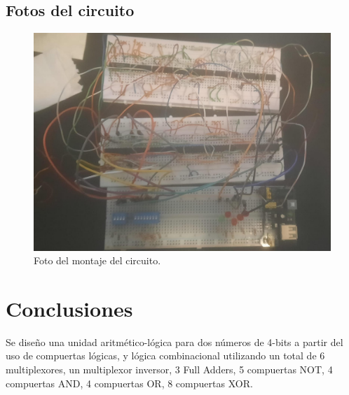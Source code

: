 \documentclass[journal, table]{IEEEtran}
\begin{document}
\subsection{Fotos del circuito}
\begin{figure}[H]
    \centering
    \includegraphics[width=\linewidth]{./Images/WhatsApp Image 2024-05-11 at 18.46.47.jpeg}
    \caption{Foto del montaje del circuito.}
    \label{fig:photo}
\end{figure}

\section{Conclusiones}
Se diseño una unidad aritmético-lógica para dos números de 4-bits a partir del
uso de compuertas lógicas, y lógica combinacional utilizando un total de 6
multiplexores, un multiplexor inversor, 3 Full Adders, 5 compuertas NOT,
4 compuertas AND, 4 compuertas OR, 8 compuertas XOR.

\printbibliography
\nocite{*}
\end{document}
